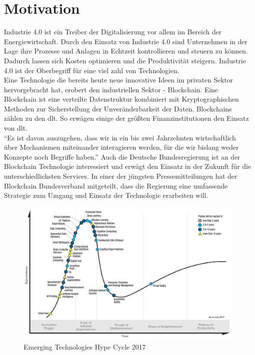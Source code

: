 \section{Motivation}

Industrie 4.0 ist ein Treiber der Digitalisierung vor allem im Bereich der Energiewirtschaft. \cite[vgl.]{UnternehmensbetreuungmbH2017} Durch den Einsatz von Industrie 4.0 sind Unternehmen in der Lage ihre Prozesse und Anlagen in Echtzeit kontrollieren und steuern zu können. Dadurch lassen sich Kosten optimieren und die Produktivität steigern. Industrie 4.0 ist der Oberbegriff für eine viel zahl von Technologien.\\
Eine Technologie die bereits heute neue innovative Ideen im privaten Sektor hervorgebracht hat, erobert den industriellen Sektor - Blockchain. Eine Blockchain ist eine verteilte Datenstruktur kombiniert mit Kryptographischen Methoden zur Sicherstellung der Unveränderbarkeit der Daten. Blockchains zählen zu den \ac{dlt}. So erwägen einige der größten Finanzinstitutionen den Einsatz von \ac{dlt}.\cite{Goldman2018}\cite{JPMorgan2018}\\

“Es ist davon auszugehen, dass wir in ein bis zwei Jahrzehnten wirtschaftlich über Mechanismen miteinander interagieren werden, für die wir bislang weder Konzepte noch Begriffe haben.” \cite[S.~92]{Platzer2014} Auch die Deutsche Bundesregierung ist an der Blockchain Technologie interessiert und erwägt den Einsatz in der Zukunft für die unterschiedlichsten Services. In einer der jüngsten Pressemitteilungen hat der Blockchain Bundesverband mitgeteilt, dass die Regierung eine umfassende Strategie zum Umgang und Einsatz der Technologie erarbeiten will. \cite{BCBundesverband2018}

\begin{figure}[h!]
	\centering
	\includegraphics[width=0.65\linewidth]{pictures/Gartner-Hype-Cycle-2017}
	\caption[Gartner Hype Cycle 2017]{Emerging Technologies Hype Cycle 2017\cite{Gartner2017}}
	\label{fig:gartner-hype-cycle-2017}
\end{figure}

